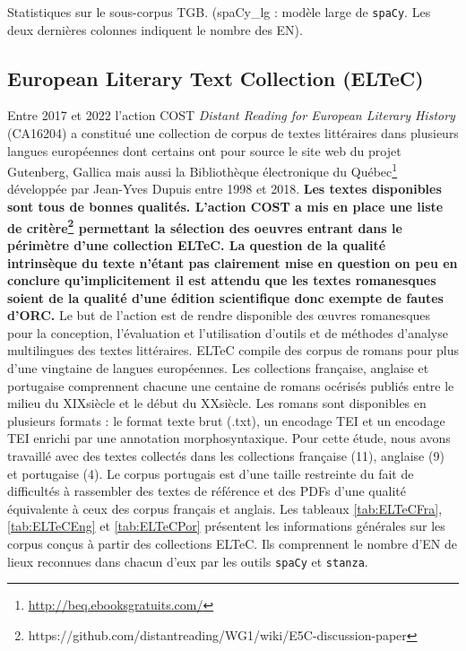 
\begin{table}[h!]
    \centering
    \small
    
    \caption{Statistiques sur le sous-corpus TGB. (spaCy\_lg : modèle large de \texttt{spaCy}. Les deux dernières colonnes indiquent le nombre des EN).}
    \label{tab:TGBFra}
\end{table}



\subsection{European Literary Text Collection (ELTeC)}

Entre 2017 et 2022 l'action COST \textit{Distant Reading for European Literary History} (CA16204) a constitué une collection de corpus de textes littéraires dans plusieurs langues européennes dont certains ont pour source le site web du projet Gutenberg, Gallica mais aussi la Bibliothèque électronique du Québec\footnote{\url{http://beq.ebooksgratuits.com/}} développée par Jean-Yves Dupuis entre 1998 et 2018. \textbf{Les textes disponibles sont tous de bonnes qualités. L'action COST a mis en place une liste de critère\footnote{https://github.com/distantreading/WG1/wiki/E5C-discussion-paper} permettant la sélection des oeuvres entrant dans le périmètre d'une collection ELTeC. La question de la qualité intrinsèque du texte n'étant pas clairement mise en question on peu en conclure qu'implicitement il est attendu que les textes romanesques soient de la qualité d'une édition scientifique donc exempte de fautes d'ORC.} Le but de l'action est de rendre disponible des œuvres romanesques pour la conception, l'évaluation et l'utilisation d'outils et de méthodes d'analyse multilingues des textes littéraires. ELTeC compile des corpus de romans pour plus d'une vingtaine de langues européennes. Les collections française, anglaise et portugaise comprennent chacune une centaine de romans océrisés publiés entre le milieu du XIX\ieme{}siècle et le début du XX\ieme{}siècle. Les romans sont disponibles en plusieurs formats : le format texte brut (.txt), un encodage TEI et un encodage TEI enrichi par une annotation morphosyntaxique.
Pour cette étude, nous avons travaillé avec des textes collectés dans les collections française (11), anglaise (9) et portugaise (4). Le corpus portugais est d'une taille restreinte du fait de difficultés à rassembler des textes de référence et des PDFs d'une qualité équivalente à ceux des corpus français et anglais. Les tableaux \ref{tab:ELTeCFra}, \ref{tab:ELTeCEng} et \ref{tab:ELTeCPor} présentent les informations générales sur les corpus conçus à partir des collections ELTeC. Ils comprennent le nombre d'EN de lieux reconnues dans chacun d'eux par les outils \texttt{spaCy} et \texttt{stanza}.

